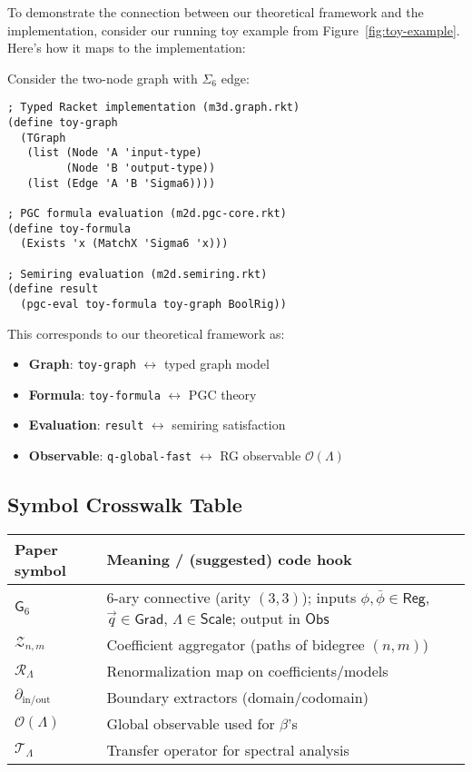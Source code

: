 To demonstrate the connection between our theoretical framework and the implementation, consider our running toy example from Figure~\ref{fig:toy-example}. Here's how it maps to the implementation:

\begin{example}
\label{ex:implementation-mapping}
Consider the two-node graph with $\Sigma_6$ edge:
\begin{verbatim}
; Typed Racket implementation (m3d.graph.rkt)
(define toy-graph
  (TGraph
   (list (Node 'A 'input-type)
         (Node 'B 'output-type))
   (list (Edge 'A 'B 'Sigma6))))

; PGC formula evaluation (m2d.pgc-core.rkt)
(define toy-formula
  (Exists 'x (MatchX 'Sigma6 'x)))

; Semiring evaluation (m2d.semiring.rkt)
(define result
  (pgc-eval toy-formula toy-graph BoolRig))
\end{verbatim}

This corresponds to our theoretical framework as:
\begin{itemize}
\item \textbf{Graph}: \texttt{toy-graph} $\leftrightarrow$ typed graph model
\item \textbf{Formula}: \texttt{toy-formula} $\leftrightarrow$ PGC theory
\item \textbf{Evaluation}: \texttt{result} $\leftrightarrow$ semiring satisfaction
\item \textbf{Observable}: \texttt{q-global-fast} $\leftrightarrow$ RG observable $\mathcal{O}(\Lambda)$
\end{itemize}
\end{example}

\subsection{Symbol Crosswalk Table}

\begin{center}
\begin{tabular}{ll}
\toprule
Paper symbol & Meaning / (suggested) code hook \\
\midrule
$\mathsf{G}_6$ & 6-ary connective (arity $(3,3)$); inputs $\phi,\bar{\phi}\in\mathsf{Reg}$, $\vec{q}\in\mathsf{Grad}$, $\Lambda\in\mathsf{Scale}$; output in $\mathsf{Obs}$ \\
$\mathcal{Z}_{n,m}$ & Coefficient aggregator (paths of bidegree $(n,m)$) \\
$\mathcal{R}_\Lambda$ & Renormalization map on coefficients/models \\
$\partial_{\text{in/out}}$ & Boundary extractors (domain/codomain) \\
$\mathcal{O}(\Lambda)$ & Global observable used for $\beta$'s \\
$\mathcal{T}_\Lambda$ & Transfer operator for spectral analysis \\
\bottomrule
\end{tabular}
\end{center}
